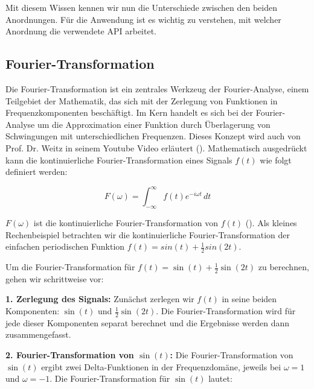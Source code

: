 \documentclass[11pt,a4paper]{article}
\begin{document}
\noindent
\newline
Mit diesem Wissen kennen wir nun die Unterschiede zwischen den beiden Anordnungen. Für die 
Anwendung ist es wichtig zu verstehen, mit welcher Anordnung die verwendete API arbeitet.


\subsection{Fourier-Transformation}
Die Fourier-Transformation ist ein zentrales Werkzeug der Fourier-Analyse, einem Teilgebiet der 
Mathematik, das sich mit der Zerlegung von Funktionen in Frequenzkomponenten beschäftigt. 
Im Kern handelt es sich bei der Fourier-Analyse um die Approximation einer Funktion durch 
Überlagerung von Schwingungen mit unterschiedlichen Frequenzen. Dieses Konzept wird auch von 
Prof. Dr. Weitz in seinem Youtube Video erläutert (\cite[2:20]{weitz2023fourier}). 
Mathematisch ausgedrückt kann die kontinuierliche Fourier-Transformation eines Signals \( f(t) \) 
wie folgt definiert werden:

\begin{equation*}
F(\omega) = \int_{-\infty}^{\infty} f(t) e^{-i \omega t} \, dt
\label{eq:fourier_transform}
\end{equation*}

\noindent
\newline
\(F(\omega)\) ist die kontinuierliche Fourier-Transformation von \(f(t)\) 
(\cite[49:27]{weitz2023fourier}). Als kleines Rechenbeispiel betrachten wir die kontinuierliche
Fourier-Transformation der einfachen periodischen Funktion \(f(t) = sin(t) + \frac{1}{2}sin(2t)\). 

\noindent
\newline
Um die Fourier-Transformation für \( f(t) = \sin(t) + \frac{1}{2}\sin(2t) \) zu berechnen, 
gehen wir schrittweise vor:

\noindent
\newline
\textbf{1. Zerlegung des Signals:}  
Zunächst zerlegen wir \( f(t) \) in seine beiden Komponenten: \( \sin(t) \) und 
\( \frac{1}{2}\sin(2t) \). Die Fourier-Transformation wird für jede dieser Komponenten separat 
berechnet und die Ergebnisse werden dann zusammengefasst.

\noindent
\newline
\textbf{2. Fourier-Transformation von \( \sin(t) \):}  
Die Fourier-Transformation von \( \sin(t) \) ergibt zwei Delta-Funktionen in der Frequenzdomäne, 
jeweils bei \( \omega = 1 \) und \( \omega = -1 \). Die Fourier-Transformation für \( \sin(t) \) 
lautet:
\end{document}
